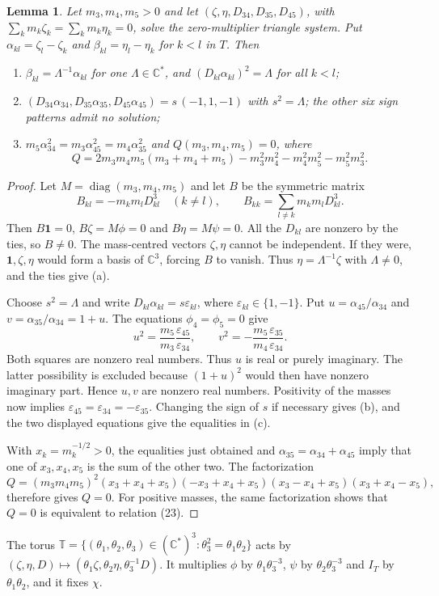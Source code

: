 \documentclass[11pt]{amsart}
\newenvironment{alphalist}{\begin{enumerate}\renewcommand{\labelenumi}{(\alph{enumi})}%
  \renewcommand{\theenumi}{\alph{enumi}}}{\end{enumerate}}
\newtheorem{lemma}[theorem]{Lemma}
\theoremstyle{definition}
\theoremstyle{remark}
\newcommand{\C}{\mathbb{C}}
\begin{document}
{\begin{lemma}\label{lem:d1-shape}
Let $m_3,m_4,m_5>0$ and let $(\zeta,\eta,D_{34},D_{35},D_{45})$, with
$\sum_km_k\zeta_k=\sum_km_k\eta_k=0$, solve the zero-multiplier triangle system.  Put
$\alpha_{kl}=\zeta_l-\zeta_k$ and $\beta_{kl}=\eta_l-\eta_k$ for $k<l$ in $T$.  Then
\begin{alphalist}
  \item $\beta_{kl}=\Lambda^{-1}\alpha_{kl}$ for one $\Lambda\in\C^*$, and $(D_{kl}\alpha_{kl})^2=
  \Lambda$ for all $k<l$;
  \item $(D_{34}\alpha_{34},D_{35}\alpha_{35},D_{45}\alpha_{45})=s\,(-1,1,-1)$ with $s^2=\Lambda$;
  the other six sign patterns admit no solution;
  \item $m_5\alpha_{34}^2=m_3\alpha_{45}^2=m_4\alpha_{35}^2$ and $Q(m_3,m_4,m_5)=0$, where
  \[
    Q=2m_3m_4m_5(m_3+m_4+m_5)-m_3^2m_4^2-m_4^2m_5^2-m_5^2m_3^2 .
  \]
\end{alphalist}
\end{lemma}}
{\begin{proof}
Let $M=\operatorname{diag}(m_3,m_4,m_5)$ and let $B$ be the symmetric matrix
\[
 B_{kl}=-m_km_lD_{kl}^3\quad(k\ne l),\qquad
 B_{kk}=\sum_{l\ne k}m_km_lD_{kl}^3.
\]
Then $B\mathbf1=0$, $B\zeta=M\phi=0$ and $B\eta=M\psi=0$.
All the $D_{kl}$ are nonzero by the ties, so $B\ne0$.
The mass-centred vectors $\zeta,\eta$ cannot be independent.
If they were, $\mathbf1,\zeta,\eta$ would form a basis of $\C^3$, forcing $B$ to vanish.
Thus $\eta=\Lambda^{-1}\zeta$ with $\Lambda\ne0$, and the ties give (a).

Choose $s^2=\Lambda$ and write $D_{kl}\alpha_{kl}=s\varepsilon_{kl}$,
where $\varepsilon_{kl}\in\{1,-1\}$.  Put
$u=\alpha_{45}/\alpha_{34}$ and $v=\alpha_{35}/\alpha_{34}=1+u$.
The equations $\phi_4=\phi_5=0$ give
\[
 u^2=\frac{m_5}{m_3}\frac{\varepsilon_{45}}{\varepsilon_{34}},
 \qquad
 v^2=-\frac{m_5}{m_4}\frac{\varepsilon_{35}}{\varepsilon_{34}}.
\]
Both squares are nonzero real numbers.  Thus $u$ is real or purely imaginary.
The latter possibility is excluded because $(1+u)^2$ would then have nonzero
imaginary part.  Hence $u,v$ are nonzero real numbers.  Positivity of the masses now implies
$\varepsilon_{45}=\varepsilon_{34}=-\varepsilon_{35}$.  Changing the sign
of $s$ if necessary gives (b), and the two displayed equations give the
equalities in (c).

With $x_k=m_k^{-1/2}>0$, the equalities just obtained and
$\alpha_{35}=\alpha_{34}+\alpha_{45}$ imply that one of $x_3,x_4,x_5$
is the sum of the other two.  The factorization
\[
 Q=(m_3m_4m_5)^2(x_3+x_4+x_5)(-x_3+x_4+x_5)
       (x_3-x_4+x_5)(x_3+x_4-x_5),
\]
therefore gives $Q=0$.  For positive masses, the same factorization shows that
$Q=0$ is equivalent to relation (23).
\end{proof}

}The torus $\mathbb T=\{(\theta_1,\theta_2,\theta_3)\in(\C^*)^3:\theta_3^2=\theta_1\theta_2\}$ acts by
$(\zeta,\eta,D)\mapsto(\theta_1\zeta,\theta_2\eta,\theta_3^{-1}D)$.  It multiplies $\phi$ by
$\theta_1\theta_3^{-3}$, $\psi$ by $\theta_2\theta_3^{-3}$ and $I_T$ by $\theta_1\theta_2$, and it
fixes $\chi$.
\end{document}
